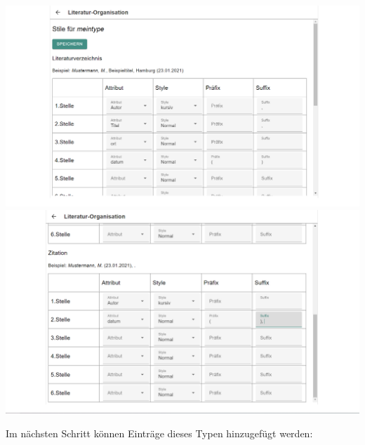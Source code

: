 \documentclass[12pt]{article}
\begin{document}
\begin{center}
\includegraphics[width=\textwidth]{dokuImages/gui_21.png}
\includegraphics[width=\textwidth]{dokuImages/gui41.png}
\end{center}
Im nächsten Schritt können Einträge dieses Typen hinzugefügt werden:
\end{document}
